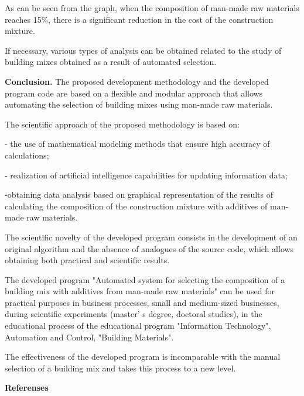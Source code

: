 \begin{multicols}{2}
As can be seen from the graph, when the composition of man-made raw
materials reaches 15\%, there is a significant reduction in the cost of
the construction mixture.

If necessary, various types of analysis can be obtained related to the
study of building mixes obtained as a result of automated selection.

{\bfseries Conclusion.} The proposed development methodology and the
developed program code are based on a flexible and modular approach that
allows automating the selection of building mixes using man-made raw
materials.

The scientific approach of the proposed methodology is based on:

- the use of mathematical modeling methods that ensure high accuracy of
calculations;

- realization of artificial intelligence capabilities for updating
information data;

-obtaining data analysis based on graphical representation of the
results of calculating the composition of the construction mixture with
additives of man-made raw materials.

The scientific novelty of the developed program consists in the
development of an original algorithm and the absence of analogues of the
source code, which allows obtaining both practical and scientific
results.

The developed program "Automated system for selecting the composition of
a building mix with additives from man-made raw materials" can be used
for practical purposes in business processes, small and medium-sized
businesses, during scientific experiments (master' s
degree, doctoral studies), in the educational process of the educational
program "Information Technology", Automation and Control, "Building
Materials".

The effectiveness of the developed program is incomparable with the
manual selection of a building mix and takes this process to a new
level.
\end{multicols}

\begin{center}
{\bfseries Referenses}
\end{center}

